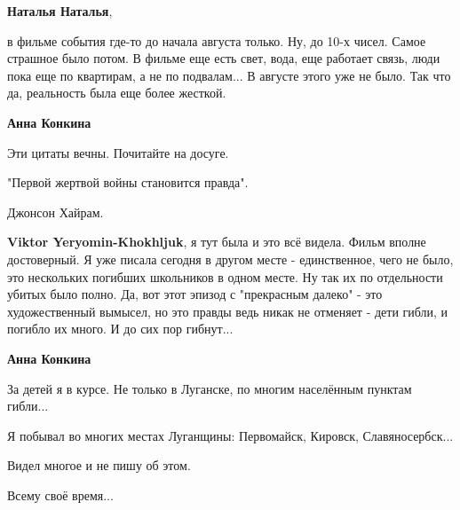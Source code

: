 \begin{itemize}
\begin{itemize}
\textbf{Наталья Наталья}, 

в фильме события где-то до начала августа только. Ну,
до 10-х чисел. Самое страшное было потом. В фильме еще есть свет, вода, еще
работает связь, люди пока еще по квартирам, а не по подвалам... В августе этого
уже не было. Так что да, реальность была еще более жесткой.


 
\textbf{Анна Конкина}

Эти цитаты вечны. Почитайте на досуге.

"Первой жертвой войны становится правда".

Джонсон Хайрам.

 
\textbf{Viktor Yeryomin-Khokhljuk}, я тут была и это всё видела. Фильм вполне
достоверный. Я уже писала сегодня в другом месте - единственное, чего не было,
это нескольких погибших школьников в одном месте. Ну так их по отдельности
убитых было полно. Да, вот этот эпизод с "прекрасным далеко" - это
художественный вымысел, но это правды ведь никак не отменяет - дети гибли, и
погибло их много. И до сих пор гибнут...

 
\textbf{Анна Конкина}

За детей я в курсе. Не только в Луганске, по многим населённым пунктам гибли...

Я побывал во многих местах Луганщины: Первомайск, Кировск, Славяносербск...

Видел многое и не пишу об этом.

Всему своё время...

 

\end{itemize}
\end{itemize}
